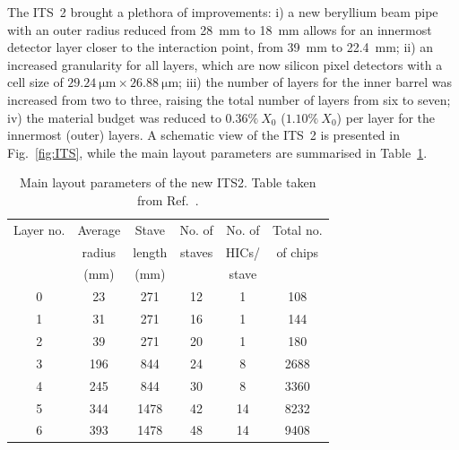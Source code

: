 The ITS~2 brought a plethora of improvements: i) a new beryllium beam pipe with an outer radius reduced from 28~mm to 18~mm allows for an innermost detector layer closer to the interaction point, from 39~mm to 22.4~mm; ii) an increased granularity for all layers, which are now silicon pixel detectors with a cell size of $\SI{29.24}{\micro\meter}\times\SI{26.88}{\micro\meter}$; iii) the number of layers for the inner barrel was increased from two to three, raising the total number of layers from six to seven; iv) the material budget was reduced to $0.36\%~X_0$ ($1.10\%~X_0$) per layer for the innermost (outer) layers. A schematic view of the ITS~2 is presented in Fig.~\ref{fig:ITS}, while the main layout parameters are summarised in Table~\ref{tab:ITS2_params}.

\begin{table}[htb]
    \centering
    \caption{Main layout parameters of the new ITS2. Table taken from Ref.~\cite{ALICE:2023udb}.}
    \vspace*{0.3cm}
    \begin{tabular}{c|ccccc}
    \toprule
    Layer no. &	Average&	Stave&	No. of &No. of &Total no.\\
    &	radius&length&staves&HICs/	&of chips\\
    &	(mm)&(mm)& &stave	&\\
    
    \midrule
    0	&23 & 271 & 12 & 1&108\\
    1	&31 & 271 & 16	& 1&144\\
    2	&39 & 271 & 20	& 1&180\\
    3	&196 & 844 & 24 & 8	&2688\\
    4	&245 & 844 & 30 & 8	& 3360\\
    5	&344 & 1478	&42 & 14 &	8232\\
    6	&393 & 1478	& 48 & 14 &	9408\\
    
    \bottomrule
    \end{tabular}
    \label{tab:ITS2_params}
\end{table}

